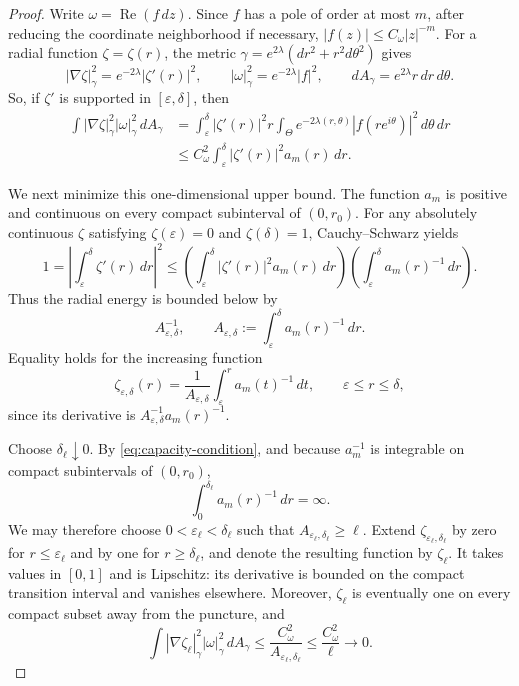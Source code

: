 \documentclass[11pt]{amsart}
\numberwithin{equation}{section}
\theoremstyle{definition}
\theoremstyle{remark}
\DeclareMathOperator{\Rea}{Re}
\begin{document}
\begin{proof}
Write $\omega=\Rea(f\,dz)$. Since $f$ has a pole of order at
most $m$, after reducing the coordinate neighborhood if necessary,
\(
|f(z)|\le C_\omega |z|^{-m}.
\)
For a radial function $\zeta=\zeta(r)$, the metric
$\gamma=e^{2\lambda}(dr^2+r^2d\theta^2)$ gives
\[
|\nabla\zeta|_\gamma^2=e^{-2\lambda}|\zeta'(r)|^2,
\qquad
|\omega|_\gamma^2=e^{-2\lambda}|f|^2,
\qquad
dA_\gamma=e^{2\lambda}r\,dr\,d\theta.
\]
So, if $\zeta'$ is supported in
$[\varepsilon,\delta]$, then
\begin{align*}
\int |\nabla\zeta|_\gamma^2|\omega|_\gamma^2\,dA_\gamma
&=\int_\varepsilon^\delta |\zeta'(r)|^2r
  \int_\Theta e^{-2\lambda(r,\theta)}
  |f(re^{i\theta})|^2\,d\theta\,dr\\
&\le C_\omega^2
  \int_\varepsilon^\delta|\zeta'(r)|^2a_m(r)\,dr.
\end{align*}

We next minimize this one-dimensional upper bound. The function
$a_m$ is positive and continuous on every compact subinterval
of $(0,r_0)$. For any absolutely continuous $\zeta$ satisfying
$\zeta(\varepsilon)=0$ and $\zeta(\delta)=1$,
Cauchy--Schwarz yields
\[
1
=\left|\int_\varepsilon^\delta\zeta'(r)\,dr\right|^2
\le
\left(\int_\varepsilon^\delta
|\zeta'(r)|^2a_m(r)\,dr\right)
\left(\int_\varepsilon^\delta a_m(r)^{-1}\,dr\right).
\]
Thus the radial energy is bounded below by
\[
A_{\varepsilon,\delta}^{-1},
\qquad
A_{\varepsilon,\delta}
:=\int_\varepsilon^\delta a_m(r)^{-1}\,dr.
\]
Equality holds for the increasing function
\[
\zeta_{\varepsilon,\delta}(r)
=
\frac{1}{A_{\varepsilon,\delta}}
\int_\varepsilon^r a_m(t)^{-1}\,dt,
\qquad \varepsilon\le r\le\delta,
\]
since its derivative is
$A_{\varepsilon,\delta}^{-1}a_m(r)^{-1}$.

Choose $\delta_\ell\downarrow0$. By
\eqref{eq:capacity-condition}, and because $a_m^{-1}$ is
integrable on compact subintervals of $(0,r_0)$,
\[
\int_0^{\delta_\ell}a_m(r)^{-1}\,dr=\infty.
\]
We may therefore choose $0<\varepsilon_\ell<\delta_\ell$ such that
$A_{\varepsilon_\ell,\delta_\ell}\ge\ell$. Extend
$\zeta_{\varepsilon_\ell,\delta_\ell}$ by zero for
$r\le\varepsilon_\ell$ and by one for $r\ge\delta_\ell$,
and denote the resulting function by $\zeta_\ell$.
It takes values in $[0,1]$ and is Lipschitz: its derivative is
bounded on the compact transition interval and vanishes elsewhere.
Moreover, $\zeta_\ell$ is eventually one on every compact subset
away from the puncture, and
\[
\int |\nabla\zeta_\ell|_\gamma^2|\omega|_\gamma^2\,dA_\gamma
\le \frac{C_\omega^2}{A_{\varepsilon_\ell,\delta_\ell}}
\le \frac{C_\omega^2}{\ell}\longrightarrow0.
\]


\end{proof}
\end{document}
